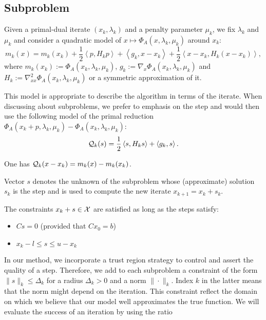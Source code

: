 \documentclass[10pt]{article}
\numberwithin{equation}{section}
\newcommand{\scal}[2]{\left\langle {#1} , {#2} \right\rangle} %
\begin{document}
	 \subsection{Subproblem}\label{subsec:subproblem}
	 
	 Given a primal-dual iterate $(x_k,\lambda_k)$ and a penalty parameter $\mu_k$, we fix $\lambda_k$ and $\mu_k$ and consider a quadratic model of $x\mapsto \Phi_A(x,\lambda_k,\mu_k)$ around $x_k$:
	 \begin{equation}\label{eq:al_quadratic _model}
	 	m_k(x) = m_k(x_k) + \dfrac{1}{2}\scal{p}{H_kp} + \scal{g_k}{x-x_k} + \dfrac{1}{2}\scal{x-x_k}{H_k(x-x_k)},
	 \end{equation}
	 where $m_k(x_k):=\Phi_A(x_k,\lambda_k,\mu_k)$, $g_k:=\nabla_x \Phi_A(x_k,\lambda_k,\mu_k)$ and $H_k:=\nabla^2_{xx} \Phi_A(x_k,\lambda_k,\mu_k)$ or a symmetric approximation of it.
	 
	 This model is appropriate to describe the algorithm in terms of the iterate. When discussing about subproblems, we prefer to emphasis on the step and would then use the following model of the primal reduction $\Phi_A(x_k+p,\lambda_k,\mu_k)-\Phi_A(x_k,\lambda_k,\mu_k)$:
	 \begin{equation}\label{eq:al_quadratic_reduction_model}
	 	\calQ_k(s) = \dfrac{1}{2}\scal{s}{H_ks} + \scal{g_k}{s}.
	 \end{equation}
	 
	 One has ${\mathcal{Q}}_k(x-x_k)=m_k(x)-m_k(x_k)$.
	 
	 Vector $s$ denotes the unknown of the subproblem whose (approximate) solution $s_k$ is the step and is used to compute the new iterate $x_{k+1}=x_k+s_k$.
	 
	 The constraints $x_k+s\in {\mathcal{X}}$ are satisfied as long as the steps satisfy:
	 \begin{itemize}
	 	\item \(Cs=0\) (provided that $Cx_0=b$)
	 	\item$ x_k-l \le s \le u-x_k$
	 \end{itemize}
	 
	In our method, we incorporate a trust region strategy to control and assert the quality of a step. Therefore, we add to each subproblem a constraint of the form $\|s\|_k \le \Delta_k$ for a radius $\Delta_k > 0$ and a norm $\|\cdot\|_k$. Index $k$ in the latter means that the norm might depend on the iteration. This constraint reflect the domain on which we believe that our model well approximates the true function. We will evaluate the success of an iteration by using the ratio
	
\end{document}
